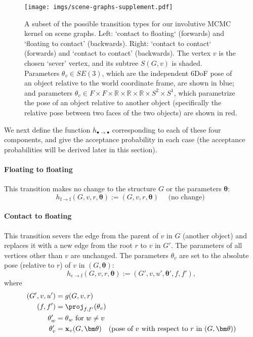 \begin{figure}[t]
  \centering
  \texttt{[image: imgs/scene-graphs-supplement.pdf]}
  \caption{
A subset of the possible transition types for our involutive MCMC kernel on scene graphs.
Left: `contact to floating` (forwards) and `floating to contact' (backwards).
Right: `contact to contact` (forwards) and `contact to contact' (backwards).
The vertex $v$ is the chosen `sever' vertex, and its subtree $S(G, v)$ is shaded.
Parameters $\theta_v \in SE(3)$, which are the independent 6DoF pose of an object relative to the world coordinate frame, are shown in blue;
and parameters $\theta_v \in F \times F \times \mathbb{R} \times \mathbb{R} \times \mathbb{R} \times S^2 \times S^1$, which parametrize the pose of an object relative to another object (specifically the relative pose between two faces of the two objects) are shown in red.
}
  \label{fig:scene-graph-transition-sup}
\end{figure}

We next define the function $h_{\bullet \to \bullet}$ corresponding to each of these four components, and give the acceptance probability in each case (the acceptance probabilities will be derived later in this section).

\paragraph{Floating to floating}
This transition makes no change to the structure $G$ or the parameters $\bm\theta$:
\begin{equation}
h_{\mathrm{f} \to \mathrm{f}}(G, v, r, \bm\theta) := (G, v, r, \bm\theta) \quad \mbox{ (no change) }
\end{equation}

\paragraph{Contact to floating}
This transition severs the edge from the parent of $v$ in $G$ (another object)
and replaces it with a new edge from the root $r$ to $v$ in $G'$.
The parameters of all vertices other than $v$ are unchanged.
The parameters $\theta_v$ are set to the absolute pose (relative to $r$) of $v$ in $(G, \bm\theta)$:
\[ h_{\mathrm{c} \to \mathrm{f}}(G, v, r, \bm\theta) := (G', v, u', \bm\theta', f, f'), \]
where
\begin{align*}
(G', v, u') &= g(G, v, r) \quad\mbox{}\\
(f, f') &= \proj_{f,f'}(\theta_v) \\
\theta_w' &= \theta_w \mbox{ for } w \ne v \\
\theta_v' &= \mathbf{x}_v(G, \bm\theta) \quad \mbox{(pose of $v$ with respect to $r$ in $(G, \bm\theta)$)}
\end{align*}


